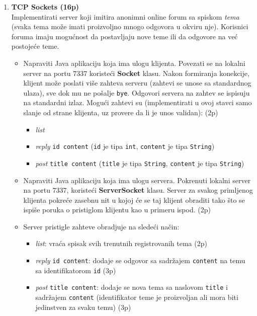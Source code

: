 \documentclass[]{article}
\begin{document}
\begin{enumerate}
  
\item \textbf{TCP Sockets (16p)}
\\Implementirati server koji imitira anonimni online forum sa spiskom \emph{tema} (svaka tema mo\v{z}e imati proizvoljno mnogo odgovora u okviru nje). Korisnici foruma imaju mogućnost da postavljaju nove teme ili da odgovore na već postojeće teme.
\begin{itemize}
  \item Napraviti Java aplikaciju koja ima ulogu klijenta. Povezati se na lokalni server na portu $7337$ koristeći \textbf{Socket} klasu. Nakon formiranja konekcije, klijent mo\v{z}e poslati vi\v{s}e zahteva serveru (zahtevi se unose sa standardnog ulaza), sve dok mu ne pošalje \texttt{bye}. Odgovori servera na zahtev se ispisuju na standardni izlaz. Mogu\'c{}i zahtevi su (implementirati u ovoj stavci samo slanje od strane klijenta, uz provere da li je unos validan): \hfill (2p)
  \begin{itemize}
      \item \textit{list}
      \item \textit{reply} \texttt{id content} (\texttt{id} je tipa \texttt{int}, \texttt{content} je tipa \texttt{String}) 
      \item \textit{post} \texttt{title content} (\texttt{title} je tipa \texttt{String}, \texttt{content} je tipa \texttt{String})
  \end{itemize}
  \item Napraviti Java aplikaciju koja ima ulogu servera. Pokrenuti lokalni server na portu $7337$, koriste\'c{}i \textbf{ServerSocket} klasu. Server za svakog primljenog klijenta pokre\'c{}e zasebnu nit u kojoj \'c{}e se taj klijent obraditi tako \v{s}to se ispi\v{s}e poruka o pristiglom klijentu kao u primeru ispod. \hfill (2p)
  \item Server pristigle zahteve obradjuje na slede\'c{}i na\v{c}in:
  \begin{itemize}
    \item \textit{list}: vra\'c{}a spisak svih trenutnih registrovanih tema \hfill (2p)
    \item \textit{reply} \texttt{id content}: dodaje se odgovor sa sadr\v{z}ajem \texttt{content} na temu sa identifikatorom \texttt{id} \hfill (3p)
    \item \textit{post} \texttt{title content}: dodaje se nova tema sa naslovom \texttt{title} i sadr\v{z}ajem \texttt{content} (identifikator teme je proizvoljan ali mora biti jedinstven za svaku temu) \hfill (3p)

\end{itemize}
\end{itemize}
\end{enumerate}
\end{document}
